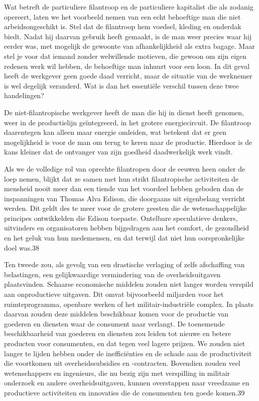 \documentclass[
  a5paper,
  smalldemyvopaper,10pt,twoside,onecolumn,openright,extrafontsizes,hidelinks]{memoir}
\renewenvironment{quote}%
               {\list{}{\rightmargin=.6cm\leftmargin=.6cm}%
                \itshape \item[]}%
               {\endlist}
\begin{document}
\begin{quote}
Wat betreft de particuliere filantroop en de particuliere kapitalist die
als zodanig opereert, laten we het voorbeeld nemen van een echt
behoeftige man die niet arbeidsongeschikt is. Stel dat de filantroop hem
voedsel, kleding en onderdak biedt. Nadat hij daarvan gebruik heeft
gemaakt, is de man weer precies waar hij eerder was, met mogelijk de
gewoonte van afhankelijkheid als extra bagage. Maar stel je voor dat
iemand zonder welwillende motieven, die gewoon om zijn eigen redenen
werk wil hebben, de behoeftige man inhuurt voor een loon. In dit geval
heeft de werkgever geen goede daad verricht, maar de situatie van de
werknemer is wel degelijk veranderd. Wat is dan het essentiële verschil
tussen deze twee handelingen?

De niet-filantropische werkgever heeft de man die hij in dienst heeft
genomen, weer in de productielijn geïntegreerd, in het grotere
energiecircuit. De filantroop daarentegen kan alleen maar energie
omleiden, wat betekent dat er geen mogelijkheid is voor de man om terug
te keren naar de productie. Hierdoor is de kans kleiner dat de ontvanger
van zijn goedheid daadwerkelijk werk vindt.

Als we de volledige rol van oprechte filantropen door de eeuwen heen
onder de loep nemen, blijkt dat ze samen met hun strikt filantropische
activiteiten de mensheid nooit meer dan een tiende van het voordeel
hebben geboden dan de inspanningen van Thomas Alva Edison, die doorgaans
uit eigenbelang verricht werden. Dit geldt des te meer voor de grotere
geesten die de wetenschappelijke principes ontwikkelden die Edison
toepaste. Ontelbare speculatieve denkers, uitvinders en organisatoren
hebben bijgedragen aan het comfort, de gezondheid en het geluk van hun
medemensen, en dat terwijl dat niet hun oorspronkelijke doel was.38
\end{quote}

Ten tweede zou, als gevolg van een drastische verlaging of zelfs
afschaffing van belastingen, een gelijkwaardige vermindering van de
overheidsuitgaven plaatsvinden. Schaarse economische middelen zouden
niet langer worden verspild aan onproductieve uitgaven. Dit omvat
bijvoorbeeld miljarden voor het ruimteprogramma, openbare werken of het
militair-industriële complex. In plaats daarvan zouden deze middelen
beschikbaar komen voor de productie van goederen en diensten waar de
consument naar verlangt. De toenemende beschikbaarheid van goederen en
diensten zou leiden tot nieuwe en betere producten voor consumenten, en
dat tegen veel lagere prijzen. We zouden niet langer te lijden hebben
onder de inefficiënties en de schade aan de productiviteit die
voortkomen uit overheidssubsidies en -contracten. Bovendien zouden veel
wetenschappers en ingenieurs, die nu bezig zijn met verspilling in
militair onderzoek en andere overheidsuitgaven, kunnen overstappen naar
vreedzame en productieve activiteiten en innovaties die de consumenten
ten goede komen.39
\end{document}

